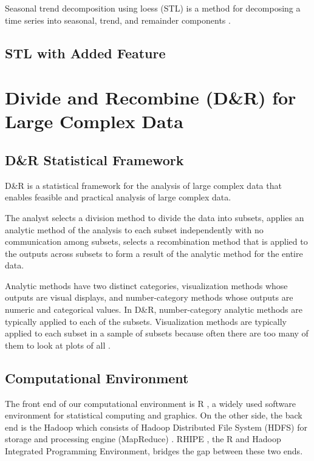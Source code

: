Seasonal trend decomposition using loess (STL) is a method for decomposing a time
series into seasonal, trend, and remainder components \cite{Cleveland:1990}.

\subsection{STL with Added Feature}

\section{Divide and Recombine (D\&R) for Large Complex Data}

\subsection{D\&R Statistical Framework}

D\&R \cite{Guha:2012} is a statistical framework for the analysis of large complex
data that enables feasible and practical analysis of large complex data. 

The 
analyst selects a division method to divide the data into subsets, applies an 
analytic method of the analysis to each subset independently with no communication
among subsets, selects a recombination method that is applied to the outputs 
across subsets to form a result of the analytic method for the entire data.

Analytic methods have two distinct categories, visualization methods whose outputs
are visual displays, and number-category methods whose outputs are numeric and 
categorical values. In D\&R, number-category analytic methods are typically applied
to each of the subsets. Visualization methods are typically applied to each subset 
in a sample of subsets because often there are too many of them to look at plots 
of all \cite{Hafen:2013}.
 
\subsection{Computational Environment}

The front end of our computational environment is R \cite{R}, a widely used 
software environment for statistical computing and graphics. On the other side, the
back end is the Hadoop which consists of Hadoop Distributed File 
System (HDFS) \cite{HDFS} for storage and processing engine (MapReduce) 
\cite{mapreduce}. RHIPE \cite{Guha:2010}, the R and Hadoop Integrated Programming 
Environment, bridges the gap between these two ends. 

